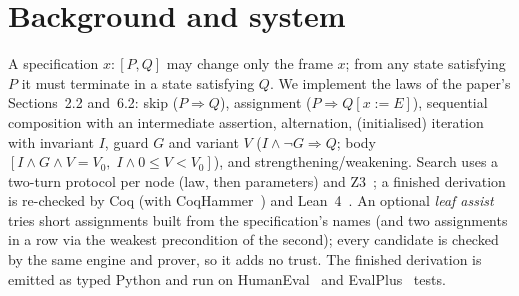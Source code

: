 \documentclass[10pt]{article}
\begin{document}
\section{Background and system}
A specification $x:[P,Q]$ may change only the frame $x$; from any state satisfying $P$ it must terminate in a state satisfying $Q$. We implement the laws of the paper's Sections~2.2 and~6.2: skip ($P\Rightarrow Q$), assignment ($P\Rightarrow Q[x:=E]$), sequential composition with an intermediate assertion, alternation, (initialised) iteration with invariant $I$, guard $G$ and variant $V$ ($I\wedge\neg G\Rightarrow Q$; body $[I\wedge G\wedge V=V_0,\; I\wedge 0\le V<V_0]$), and strengthening/weakening. Search uses a two-turn protocol per node (law, then parameters) and Z3~\cite{z3}; a finished derivation is re-checked by Coq (with CoqHammer~\cite{coqhammer}) and Lean~4~\cite{lean4}. An optional \emph{leaf assist} tries short assignments built from the specification's names (and two assignments in a row via the weakest precondition of the second); every candidate is checked by the same engine and prover, so it adds no trust. The finished derivation is emitted as typed Python and run on HumanEval~\cite{humaneval} and EvalPlus~\cite{evalplus} tests.
\end{document}
